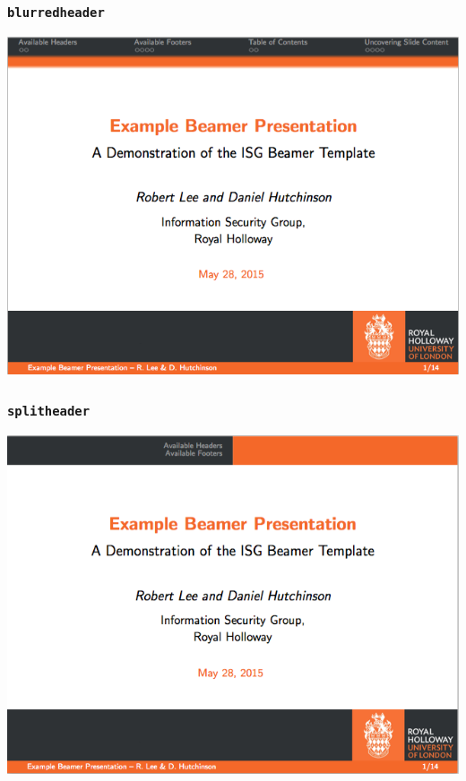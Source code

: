 \documentclass[]{beamer}
\begin{document}
\begin{frame}\frametitle{\texttt{blurredheader}}
\begin{center}
	\includegraphics[scale=0.4]{graphics/blurredheader.png}
\end{center}
\end{frame}

\begin{frame}\frametitle{\texttt{splitheader}}
\begin{center}
	\includegraphics[scale=0.4]{graphics/splitheader.png}
\end{center}
\end{frame}
\end{document}
